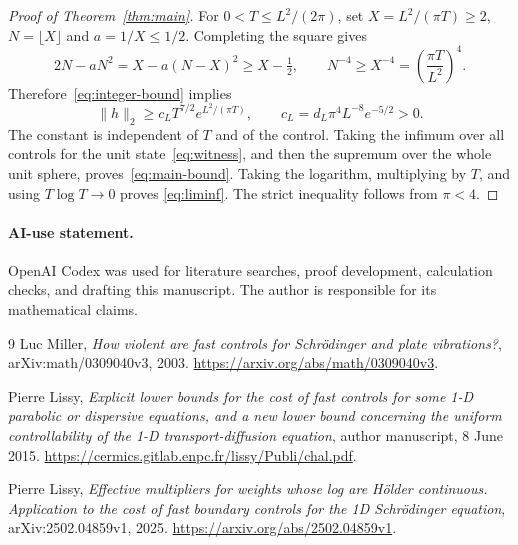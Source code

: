\documentclass[11pt]{article}
\begin{document}
\begin{proof}[Proof of Theorem~\ref{thm:main}]
For $0<T\le L^2/(2\pi)$, set
$X=L^2/(\pi T)\ge2$, $N=\lfloor X\rfloor$ and $a=1/X\le1/2$.
Completing the square gives
\[
 2N-aN^2=X-a(N-X)^2\ge X-\tfrac12,
 \qquad N^{-4}\ge X^{-4}=\left(\frac{\pi T}{L^2}\right)^4.
\]
Therefore~\eqref{eq:integer-bound} implies
\begin{equation}\label{eq:control-bound}
 \|h\|_2\ge c_L T^{7/2}e^{L^2/(\pi T)},\qquad
 c_L=d_L\pi^4L^{-8}e^{-5/2}>0.
\end{equation}
The constant is independent of $T$ and of the control. Taking the infimum
over all controls for the unit state~\eqref{eq:witness}, and then the
supremum over the whole unit sphere, proves~\eqref{eq:main-bound}.
Taking the logarithm, multiplying by $T$, and using $T\log T\to0$ proves
\eqref{eq:liminf}. The strict inequality follows from $\pi<4$.
\end{proof}

\paragraph{AI-use statement.}
OpenAI Codex was used for literature searches, proof development, calculation
checks, and drafting this manuscript. The author is responsible for its
mathematical claims.

\begin{thebibliography}{9}
Luc Miller,
\emph{How violent are fast controls for Schr\"odinger and plate vibrations?},
arXiv:math/0309040v3, 2003.
\url{https://arxiv.org/abs/math/0309040v3}.

Pierre Lissy,
\emph{Explicit lower bounds for the cost of fast controls for some 1-D
parabolic or dispersive equations, and a new lower bound concerning the
uniform controllability of the 1-D transport-diffusion equation},
author manuscript, 8 June 2015.
\url{https://cermics.gitlab.enpc.fr/lissy/Publi/chal.pdf}.

Pierre Lissy,
\emph{Effective multipliers for weights whose log are H\"older continuous.
Application to the cost of fast boundary controls for the 1D Schr\"odinger
equation}, arXiv:2502.04859v1, 2025.
\url{https://arxiv.org/abs/2502.04859v1}.
\end{thebibliography}
\end{document}
